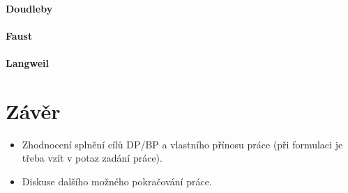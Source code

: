 \documentclass[11pt,twoside,a4paper]{book}
\begin{document}
\newpage
\subsubsection{Doudleby}

\newpage
\subsubsection{Faust}

\newpage
\subsubsection{Langweil}



\chapter{Závěr}

\begin{itemize}
\item Zhodnocení splnění cílů DP/BP a  vlastního přínosu práce (při formulaci je třeba vzít v potaz zadání práce).
\item Diskuse dalšího možného pokračování práce.
\end{itemize} 


%




%
\def\CS{$\cal C\kern-0.1667em\lower.5ex\hbox{$\cal S$}\kern-0.075em $}

\end{document}
